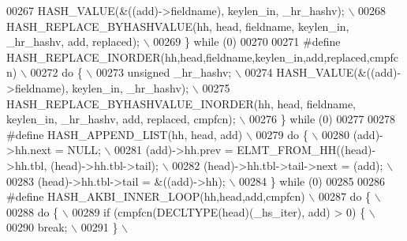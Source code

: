 \begin{DoxyCode}
{{{00267 \textcolor{preprocessor}{  HASH\_VALUE(&((add)->fieldname), keylen\_in, \_hr\_hashv);                         \(\backslash\)}
00268 \textcolor{preprocessor}{  HASH\_REPLACE\_BYHASHVALUE(hh, head, fieldname, keylen\_in, \_hr\_hashv, add, replaced); \(\backslash\)}
00269 \textcolor{preprocessor}{\} while (0)}
00270 
00271 \textcolor{preprocessor}{#define HASH\_REPLACE\_INORDER(hh,head,fieldname,keylen\_in,add,replaced,cmpfcn)    \(\backslash\)}
00272 \textcolor{preprocessor}{do \{                                                                             \(\backslash\)}
00273 \textcolor{preprocessor}{  unsigned \_hr\_hashv;                                                            \(\backslash\)}
00274 \textcolor{preprocessor}{  HASH\_VALUE(&((add)->fieldname), keylen\_in, \_hr\_hashv);                         \(\backslash\)}
00275 \textcolor{preprocessor}{  HASH\_REPLACE\_BYHASHVALUE\_INORDER(hh, head, fieldname, keylen\_in, \_hr\_hashv, add, replaced, cmpfcn); \(\backslash\)}
00276 \textcolor{preprocessor}{\} while (0)}
00277 
00278 \textcolor{preprocessor}{#define HASH\_APPEND\_LIST(hh, head, add)                                          \(\backslash\)}
00279 \textcolor{preprocessor}{do \{                                                                             \(\backslash\)}
00280 \textcolor{preprocessor}{  (add)->hh.next = NULL;                                                         \(\backslash\)}
00281 \textcolor{preprocessor}{  (add)->hh.prev = ELMT\_FROM\_HH((head)->hh.tbl, (head)->hh.tbl->tail);           \(\backslash\)}
00282 \textcolor{preprocessor}{  (head)->hh.tbl->tail->next = (add);                                            \(\backslash\)}
00283 \textcolor{preprocessor}{  (head)->hh.tbl->tail = &((add)->hh);                                           \(\backslash\)}
00284 \textcolor{preprocessor}{\} while (0)}
00285 
00286 \textcolor{preprocessor}{#define HASH\_AKBI\_INNER\_LOOP(hh,head,add,cmpfcn)                                 \(\backslash\)}
00287 \textcolor{preprocessor}{do \{                                                                             \(\backslash\)}
00288 \textcolor{preprocessor}{  do \{                                                                           \(\backslash\)}
00289 \textcolor{preprocessor}{    if (cmpfcn(DECLTYPE(head)(\_hs\_iter), add) > 0) \{                             \(\backslash\)}
00290 \textcolor{preprocessor}{      break;                                                                     \(\backslash\)}
00291 \textcolor{preprocessor}{    \}                                                                            \(\backslash\)}
}}}
\end{DoxyCode}
